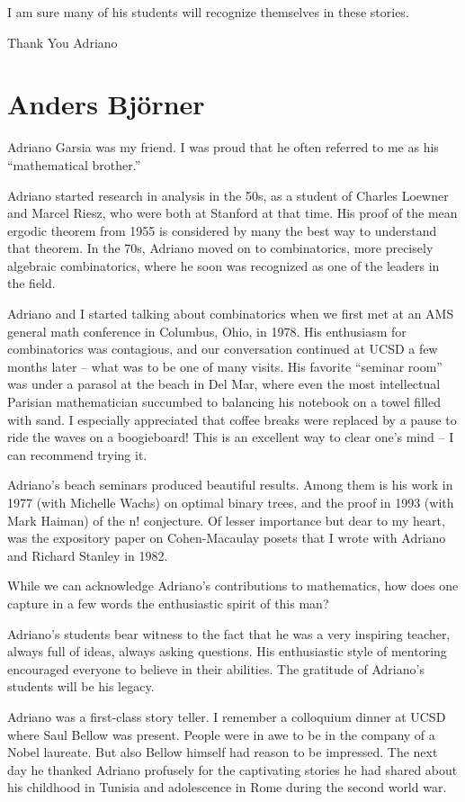 \documentclass{notices}
\begin{document}
I am sure many of his students will recognize themselves in these stories.

Thank You Adriano

\section*{Anders Bj\"orner}

Adriano Garsia was my friend. I was proud that he often referred to me as his ``mathematical brother.'' 
 
Adriano started research in analysis in the 50s, as a student of Charles Loewner and Marcel Riesz, who were both at Stanford at that time. His proof of the mean ergodic theorem from 1955 is considered by many the best way to understand that theorem. In the 70s, Adriano moved on to combinatorics, more precisely algebraic combinatorics, where he soon was recognized as one of the leaders in the field.
 
Adriano and I started talking about combinatorics when we first met at an AMS general math conference in Columbus, Ohio, in 1978. His enthusiasm for combinatorics was contagious, and our conversation continued at UCSD a few months later – what was to be one of many visits. His favorite ``seminar room'' was under a parasol at the beach in Del Mar, where even the most intellectual Parisian mathematician succumbed to balancing his notebook on a towel filled with sand. I especially appreciated that coffee breaks were replaced by a pause to ride the waves on a boogieboard! This is an excellent way to clear one's mind – I can recommend trying it.
 
Adriano's beach seminars produced beautiful results. Among them is his work in 1977 (with Michelle Wachs) on optimal binary trees, and the proof in 1993 (with Mark Haiman) of the n! conjecture. Of lesser importance but dear to my heart, was the expository paper on Cohen-Macaulay posets that I wrote with Adriano and Richard Stanley in 1982. 
 
While we can acknowledge Adriano's contributions to mathematics, how does one capture in a few words the enthusiastic spirit of this man?
 
Adriano's students bear witness to the fact that he was a very inspiring teacher, always full of ideas, always asking questions.  His enthusiastic style of mentoring encouraged everyone to believe in their abilities. The gratitude of Adriano's students will be his legacy.
 
Adriano was a first-class story teller. I remember a colloquium dinner at UCSD where Saul Bellow was present. People were in awe to be in the company of a Nobel laureate. But also Bellow himself had reason to be impressed.  The next day he thanked Adriano profusely for the captivating stories he had shared about his childhood in Tunisia and adolescence in Rome during the second world war.
 
\end{document}
